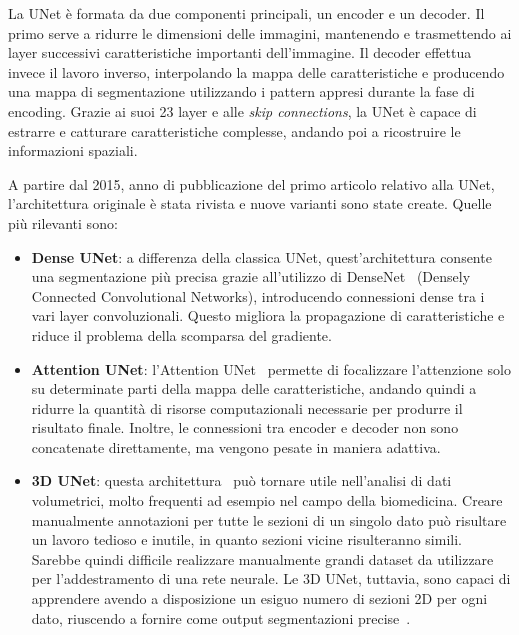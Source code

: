 \documentclass[12pt]{report}
\begin{document}
La UNet è formata da due componenti principali, un encoder e un decoder. Il primo serve a ridurre le dimensioni delle immagini, mantenendo e trasmettendo ai layer successivi caratteristiche importanti dell'immagine. Il decoder effettua invece il lavoro inverso, interpolando la mappa delle caratteristiche e producendo una mappa di segmentazione utilizzando i pattern appresi durante la fase di encoding. Grazie ai suoi 23 layer e alle \textit{skip connections}, la UNet è capace di estrarre e catturare caratteristiche complesse, andando poi a ricostruire le informazioni spaziali.

A partire dal 2015, anno di pubblicazione del primo articolo relativo alla UNet, l'architettura originale è stata rivista e nuove varianti sono state create. Quelle più rilevanti sono:

\begin{itemize}
	\item \textbf{Dense UNet}: a differenza della classica UNet, quest'architettura consente una segmentazione più precisa grazie all'utilizzo di DenseNet~\cite{8296389} (Densely Connected Convolutional Networks), introducendo connessioni dense tra i vari layer convoluzionali. Questo migliora la propagazione di caratteristiche e riduce il problema della scomparsa del gradiente.
	
	\item \textbf{Attention UNet}: l'Attention UNet~\cite{oktay2018attentionunetlearninglook} permette di focalizzare l'attenzione solo su determinate parti della mappa delle caratteristiche, andando quindi a ridurre la quantità di risorse computazionali necessarie per produrre il risultato finale. Inoltre, le connessioni tra encoder e decoder non sono concatenate direttamente, ma vengono pesate in maniera adattiva.
	
	\item \textbf{3D UNet}: questa architettura~\cite{çiçek20163dunetlearningdense} può tornare utile nell'analisi di dati volumetrici, molto frequenti ad esempio nel campo della biomedicina. Creare manualmente annotazioni per tutte le sezioni di un singolo dato può risultare un lavoro tedioso e inutile, in quanto sezioni vicine risulteranno simili. Sarebbe quindi difficile realizzare manualmente grandi dataset da utilizzare per l'addestramento di una rete neurale. Le 3D UNet, tuttavia, sono capaci di apprendere avendo a disposizione un esiguo numero di sezioni 2D per ogni dato, riuscendo a fornire come output segmentazioni precise~\cite{çiçek20163dunetlearningdense}.
\end{itemize}
\end{document}
